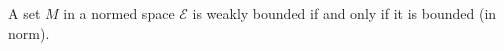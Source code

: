 A set $M$ in a normed space $\mathcal{E}$ is weakly bounded if and only if it is bounded (in norm).
